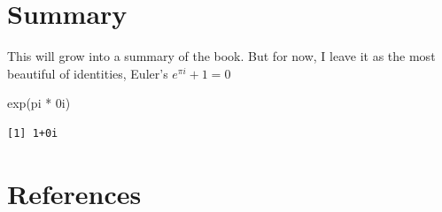 \documentclass[
  letterpaper,
  10pt,
  krantz2]{krantz}
\makeatletter
\newenvironment{Shaded}{\begin{snugshade}}{\end{snugshade}}
\newcommand{\FunctionTok}[1]{\textcolor[rgb]{0.28,0.35,0.67}{#1}}
\newcommand{\NormalTok}[1]{\textcolor[rgb]{0.00,0.23,0.31}{#1}}
\newcommand{\SpecialCharTok}[1]{\textcolor[rgb]{0.37,0.37,0.37}{#1}}
\newenvironment{kframe}{%
  \medskip{}
  \setlength{\fboxsep}{.8em}
  \def\at@end@of@kframe{}%
  \ifinner\ifhmode%
  \def\at@end@of@kframe{\end{minipage}}%
  \begin{minipage}{\columnwidth}%
  \fi\fi%
  \def\FrameCommand##1{\hskip\@totalleftmargin \hskip-\fboxsep
  \colorbox{shadecolor}{##1}\hskip-\fboxsep
      \hskip-\linewidth \hskip-\@totalleftmargin \hskip\columnwidth}%
  \MakeFramed {\advance\hsize-\width
    \@totalleftmargin\z@ \linewidth\hsize
    \@setminipage}}%
{\par\unskip\endMakeFramed%
  \at@end@of@kframe}
\renewenvironment{Shaded}{\begin{kframe}}{\end{kframe}}
\makeatother
\begin{document}

\hypertarget{summary}{%
\chapter{Summary}\label{summary}}

This will grow into a summary of the book. But for now, I leave it as
the most beautiful of identities, Euler's \(e^{\pi i} + 1 = 0\)

\begin{Shaded}
\begin{Highlighting}[]
\FunctionTok{exp}\NormalTok{(pi }\SpecialCharTok{*}\NormalTok{ 0i) }
\end{Highlighting}
\end{Shaded}

\begin{verbatim}
[1] 1+0i
\end{verbatim}


\hypertarget{references}{%
\chapter*{References}\label{references}}

\end{document}
